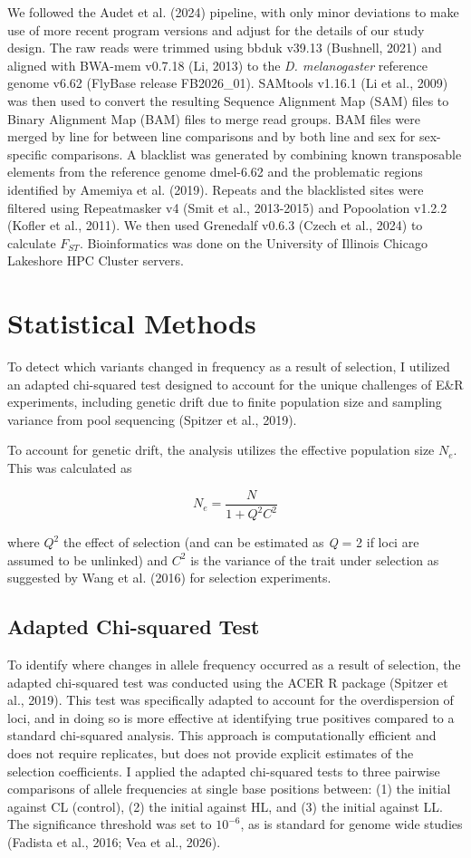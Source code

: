 \documentclass[12pt,reqno,oneside]{report}
\begin{document}
We followed the Audet et al. (2024) pipeline, with only minor deviations to make use of more recent program versions and adjust for the details of our study design. The raw reads were trimmed using bbduk v39.13 (Bushnell, 2021) and aligned with BWA-mem v0.7.18 (Li, 2013) to the \textit{D. melanogaster} reference genome v6.62 (FlyBase release FB2026\_01). SAMtools v1.16.1 (Li et al., 2009) was then used to convert the resulting Sequence Alignment Map (SAM) files to Binary Alignment Map (BAM) files to merge read groups. BAM files were merged by line for between line comparisons and by both line and sex for sex-specific comparisons. A blacklist was generated by combining known transposable elements from the reference genome dmel-6.62 and the problematic regions identified by Amemiya et al. (2019). Repeats and the blacklisted sites were filtered using Repeatmasker v4 (Smit et al., 2013-2015) and Popoolation v1.2.2 (Kofler et al., 2011). We then used Grenedalf v0.6.3 (Czech et al., 2024) to calculate \(F_{ST}\). Bioinformatics was done on the University of Illinois Chicago Lakeshore HPC Cluster servers.

\section{Statistical Methods}

To detect which variants changed in frequency as a result of selection, I utilized an adapted chi-squared test designed to account for the unique challenges of E\&R experiments, including genetic drift due to finite population size and sampling variance from pool sequencing (Spitzer et al., 2019).

To account for genetic drift, the analysis utilizes the effective population size \(N_e\). This was calculated as 

\[N_e = \frac{N}{1 + Q^2C^2}\]

\noindent where \(Q^2\) the effect of selection (and can be estimated as \textit{Q} = 2 if loci are assumed to be unlinked) and \(C^2\) is the variance of the trait under selection as suggested by Wang et al. (2016) for selection experiments.

\subsection{Adapted Chi-squared Test} 

To identify where changes in allele frequency occurred as a result of selection, the adapted chi-squared test was conducted using the ACER R package (Spitzer et al., 2019). This test was specifically adapted to account for the overdispersion of loci, and in doing so is more effective at identifying true positives compared to a standard chi-squared analysis. This approach is computationally efficient and does not require replicates, but does not provide explicit estimates of the selection coefficients. I applied the adapted chi-squared tests to three pairwise comparisons of allele frequencies at single base positions between: (1) the initial against CL (control), (2) the initial against HL, and (3) the initial against LL. The significance threshold was set to \(10^{-6}\), as is standard for genome wide studies (Fadista et al., 2016; Vea et al., 2026).
\end{document}

